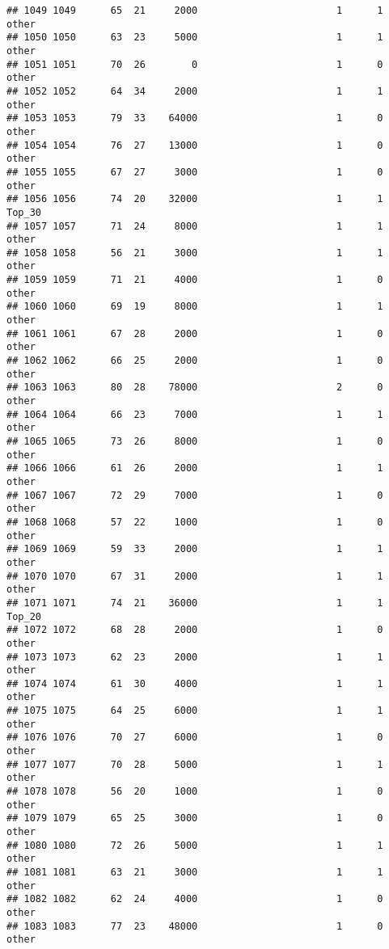 \documentclass[
]{article}
\begin{document}
\begin{verbatim}
## 1049 1049      65  21     2000                        1      1    other
## 1050 1050      63  23     5000                        1      1    other
## 1051 1051      70  26        0                        1      0    other
## 1052 1052      64  34     2000                        1      1    other
## 1053 1053      79  33    64000                        1      0    other
## 1054 1054      76  27    13000                        1      0    other
## 1055 1055      67  27     3000                        1      0    other
## 1056 1056      74  20    32000                        1      1   Top_30
## 1057 1057      71  24     8000                        1      1    other
## 1058 1058      56  21     3000                        1      1    other
## 1059 1059      71  21     4000                        1      0    other
## 1060 1060      69  19     8000                        1      1    other
## 1061 1061      67  28     2000                        1      0    other
## 1062 1062      66  25     2000                        1      0    other
## 1063 1063      80  28    78000                        2      0    other
## 1064 1064      66  23     7000                        1      1    other
## 1065 1065      73  26     8000                        1      0    other
## 1066 1066      61  26     2000                        1      1    other
## 1067 1067      72  29     7000                        1      0    other
## 1068 1068      57  22     1000                        1      0    other
## 1069 1069      59  33     2000                        1      1    other
## 1070 1070      67  31     2000                        1      1    other
## 1071 1071      74  21    36000                        1      1   Top_20
## 1072 1072      68  28     2000                        1      0    other
## 1073 1073      62  23     2000                        1      1    other
## 1074 1074      61  30     4000                        1      1    other
## 1075 1075      64  25     6000                        1      1    other
## 1076 1076      70  27     6000                        1      0    other
## 1077 1077      70  28     5000                        1      1    other
## 1078 1078      56  20     1000                        1      0    other
## 1079 1079      65  25     3000                        1      0    other
## 1080 1080      72  26     5000                        1      1    other
## 1081 1081      63  21     3000                        1      1    other
## 1082 1082      62  24     4000                        1      0    other
## 1083 1083      77  23    48000                        1      0    other

\end{verbatim}
\end{document}
